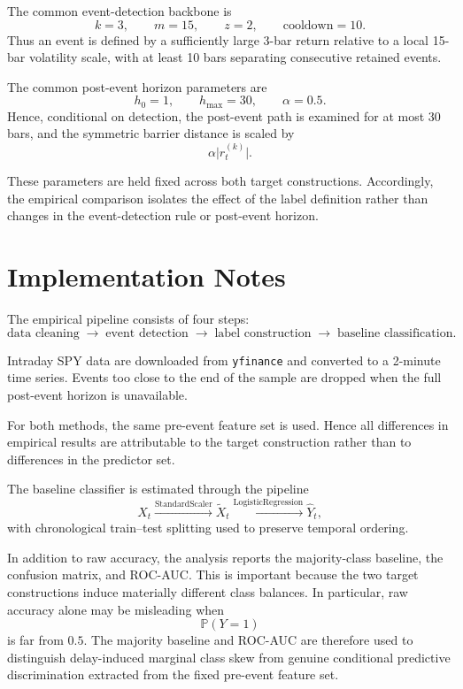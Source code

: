 \documentclass[11pt,a4paper]{article}
\begin{document}
	The common event-detection backbone is
	\[
	k = 3, \qquad m = 15, \qquad z = 2, \qquad \mathrm{cooldown} = 10.
	\]
	Thus an event is defined by a sufficiently large 3-bar return relative to a local 15-bar volatility scale, with at least 10 bars separating consecutive retained events.
	
	The common post-event horizon parameters are
	\[
	h_0 = 1, \qquad h_{\max} = 30, \qquad \alpha = 0.5.
	\]
	Hence, conditional on detection, the post-event path is examined for at most 30 bars, and the symmetric barrier distance is scaled by
	\[
	\alpha \lvert r_t^{(k)} \rvert.
	\]
	
	These parameters are held fixed across both target constructions. Accordingly, the empirical comparison isolates the effect of the label definition rather than changes in the event-detection rule or post-event horizon.
	
	\section{Implementation Notes}
	
	The empirical pipeline consists of four steps:
	\[
	\text{data cleaning}
	\;\longrightarrow\;
	\text{event detection}
	\;\longrightarrow\;
	\text{label construction}
	\;\longrightarrow\;
	\text{baseline classification}.
	\]
	
	Intraday SPY data are downloaded from \texttt{yfinance} and converted to a 2-minute time series. Events too close to the end of the sample are dropped when the full post-event horizon is unavailable.
	
	For both methods, the same pre-event feature set is used. Hence all differences in empirical results are attributable to the target construction rather than to differences in the predictor set.
	
	The baseline classifier is estimated through the pipeline
	\[
	X_t \xrightarrow{\text{StandardScaler}} \widetilde{X}_t \xrightarrow{\text{LogisticRegression}} \widehat{Y}_t,
	\]
	with chronological train--test splitting used to preserve temporal ordering.
	
	In addition to raw accuracy, the analysis reports the majority-class baseline, the confusion matrix, and ROC-AUC. This is important because the two target constructions induce materially different class balances. In particular, raw accuracy alone may be misleading when
	\[
	\mathbb{P}(Y=1)
	\]
	is far from \(0.5\). The majority baseline and ROC-AUC are therefore used to distinguish delay-induced marginal class skew from genuine conditional predictive discrimination extracted from the fixed pre-event feature set.
	
\end{document}
